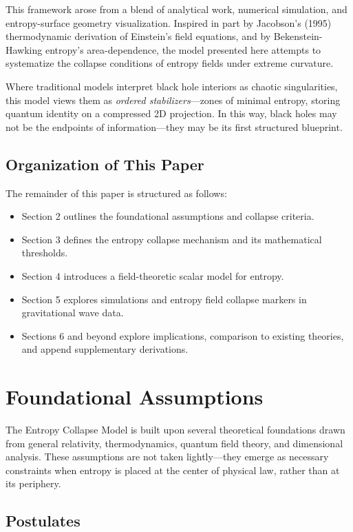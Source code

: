 \documentclass[12pt]{article}
\begin{document}
This framework arose from a blend of analytical work, numerical simulation, and entropy-surface geometry visualization. Inspired in part by Jacobson’s (1995) thermodynamic derivation of Einstein’s field equations, and by Bekenstein-Hawking entropy’s area-dependence, the model presented here attempts to systematize the collapse conditions of entropy fields under extreme curvature.

Where traditional models interpret black hole interiors as chaotic singularities, this model views them as \textit{ordered stabilizers}—zones of minimal entropy, storing quantum identity on a compressed 2D projection. In this way, black holes may not be the endpoints of information—they may be its first structured blueprint.
\FloatBarrier

\clearpage
\subsection*{Organization of This Paper}

The remainder of this paper is structured as follows:
\begin{itemize}[leftmargin=1.5em]
  \item Section 2 outlines the foundational assumptions and collapse criteria.
  \item Section 3 defines the entropy collapse mechanism and its mathematical thresholds.
  \item Section 4 introduces a field-theoretic scalar model for entropy.
  \item Section 5 explores simulations and entropy field collapse markers in gravitational wave data.
  \item Sections 6 and beyond explore implications, comparison to existing theories, and append supplementary derivations.
\end{itemize}

\clearpage
\section{Foundational Assumptions}

\FloatBarrier
The Entropy Collapse Model is built upon several theoretical foundations drawn from general relativity, thermodynamics, quantum field theory, and dimensional analysis. These assumptions are not taken lightly—they emerge as necessary constraints when entropy is placed at the center of physical law, rather than at its periphery.

\clearpage
\subsection*{Postulates}
\end{document}
